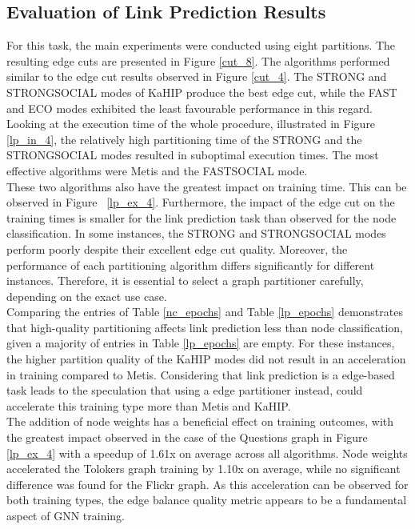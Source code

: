 \documentclass[acmsmall,nonacm,screen,review]{acmart}
\begin{document}
\subsection{Evaluation of Link Prediction Results}
For this task, the main experiments were conducted using eight partitions. The resulting edge cuts are presented in Figure \ref{cut_8}. The algorithms performed similar to the edge cut results observed in Figure \ref{cut_4}. The STRONG and STRONGSOCIAL modes of KaHIP produce the best edge cut, while the FAST and ECO modes exhibited the least favourable performance in this regard. \\
Looking at the execution time of the whole procedure, illustrated in Figure \ref{lp_in_4}, the relatively high partitioning time of the STRONG and the STRONGSOCIAL modes resulted in suboptimal execution times. The most effective algorithms were Metis and the FASTSOCIAL mode. \\
These two algorithms also have the greatest impact on training time. This can be observed in Figure ~\ref{lp_ex_4}. Furthermore, the impact of the edge cut on the training times is smaller for the link prediction task than observed for the node classification. In some instances, the STRONG and STRONGSOCIAL modes perform poorly despite their excellent edge cut quality. Moreover, the performance of each partitioning algorithm differs significantly for different instances. Therefore, it is essential to select a graph partitioner carefully, depending on the exact use case. \\
Comparing the entries of Table \ref{nc_epochs} and Table \ref{lp_epochs} demonstrates that high-quality partitioning affects link prediction less than node classification, given a majority of entries in Table \ref{lp_epochs} are empty. For these instances, the higher partition quality of the KaHIP modes did not result in an acceleration in training compared to Metis. Considering that link prediction is a edge-based task leads to the speculation that using a edge partitioner instead, could accelerate this training type more than Metis and KaHIP.\\
The addition of node weights has a beneficial effect on training outcomes, with the greatest impact observed in the case of the Questions graph in Figure \ref{lp_ex_4} with a speedup of 1.61x on average across all algorithms. Node weights accelerated the Tolokers graph training by 1.10x on average, while no significant difference was found for the Flickr graph. As this acceleration can be observed for both training types, the edge balance quality metric appears to be a fundamental aspect of GNN training. \\
\end{document}
